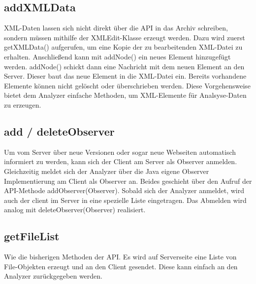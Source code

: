 
\subsection {addXMLData}

XML-Daten lassen sich nicht direkt über die API in das Archiv schreiben, sondern müssen mithilfe der XMLEdit-Klasse erzeugt werden.
Dazu wird zuerst getXMLData() aufgerufen, um eine Kopie der zu bearbeitenden XML-Datei zu erhalten.
Anschließend kann mit addNode() ein neues Element hinzugefügt  werden.
addNode() schickt dann eine Nachricht mit dem neuen Element an den Server.
Dieser baut das neue Element in die XML-Datei ein.
Bereits vorhandene Elemente können nicht gelöscht oder überschrieben werden.
Diese Vorgehensweise bietet dem Analyzer einfache Methoden, um XML-Elemente für Analsyse-Daten zu erzeugen.


\subsection {add / deleteObserver}

Um vom Server über neue Versionen oder sogar neue Webseiten automatisch informiert zu werden, kann sich der Client am Server als Observer anmelden.
Gleichzeitig meldet sich der Analyzer über die Java eigene Observer Implementierung am Client als Observer an.
Beides geschieht über den Aufruf der API-Methode addObserver(Observer).
Sobald sich der Analyzer anmeldet, wird auch der client im Server in eine spezielle Liste eingetragen.
Das Abmelden wird analog mit deleteObserver(Observer) realisiert.

\subsection {getFileList}

Wie die bisherigen Methoden der API.
Es wird auf Serverseite eine Liste von File-Objekten erzeugt und an den Client gesendet.
Diese kann einfach an den Analyzer zurückgegeben werden.

